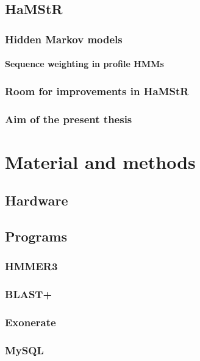 \documentclass[a4paper,12pt]{scrreprt}
\newcommand{\hamstr}{HaMStR\xspace}
\begin{document}
	\section{\hamstr}
		
		\subsection{Hidden Markov models}
			
			\subsubsection{Sequence weighting in profile HMMs}
				
		\subsection{Room for improvements in \hamstr}
			
		\subsection{Aim of the present thesis}
			

\chapter{Material and methods}
	\section{Hardware}
		
	\section{Programs}
		
		\subsection{HMMER3}
			
		\subsection{BLAST+}
			
		\subsection{Exonerate}
			
		\subsection{MySQL}
			
\end{document}
